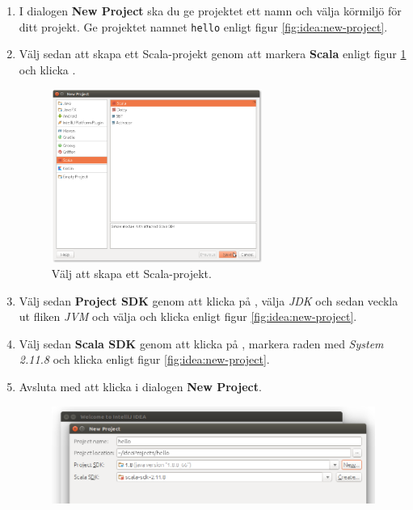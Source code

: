 \begin{enumerate}
\item I dialogen \textbf{New Project} ska du ge projektet ett namn och välja körmiljö för ditt projekt. Ge projektet namnet \texttt{hello} enligt figur \ref{fig:idea:new-project}.

\item Välj sedan att skapa ett Scala-projekt genom att markera \textbf{Scala} enligt figur \ref{fig:idea:new-scala-project} och klicka .

\begin{figure}[H]
\centering
\includegraphics[width=0.65\textwidth]{../img/intellij/idea-new-scala-project.png}
\caption{Välj att skapa ett Scala-projekt.}
\label{fig:idea:new-scala-project}
\end{figure}

\item Välj sedan \textbf{Project SDK} genom att klicka på , välja \textit{JDK} och sedan veckla ut fliken \textit{JVM} och  välja  och klicka  enligt  figur \ref{fig:idea:new-project}.

\item Välj sedan \textbf{Scala SDK} genom att klicka på , markera raden med \textit{System 2.11.8} och klicka  enligt  figur \ref{fig:idea:new-project}.

\item Avsluta med att klicka  i dialogen \textbf{New Project}.

\begin{figure}[H]
\centering
\includegraphics[width=1.0\textwidth]{../img/intellij/idea-new-project.png}


\end{figure}
\end{enumerate}
